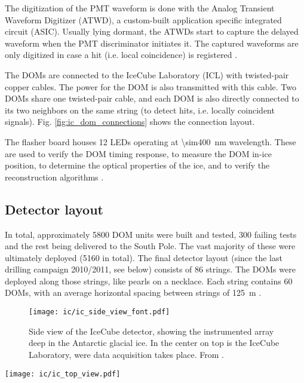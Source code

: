 The digitization of the PMT waveform is done with the Analog Transient Waveform Digitizer (ATWD), a custom-built application specific integrated circuit (ASIC). Usually lying dormant, the ATWDs start to capture the delayed waveform when the PMT discriminator initiates it. The captured waveforms are only digitized in case a hit (i.e. local coincidence) is registered .

The DOMs are connected to the IceCube Laboratory (ICL) with twisted-pair copper cables. The power for the DOM is also transmitted with this cable. Two DOMs share one twisted-pair cable, and each DOM is also directly connected to its two neighbors on the same string (to detect hits, i.e. locally coincident signals). Fig. \ref{fig:ic_dom_connections} shows the connection layout.

The flasher board houses 12 LEDs operating at \SI{\sim400}{\nm} wavelength. These are used to verify the DOM timing response, to measure the DOM in-ice position, to determine the optical properties of the ice, and to verify the reconstruction algorithms \cite{Aartsen2017}.

\subsection{Detector layout}
In total, approximately 5800 DOM units were built and tested, 300 failing tests and the rest being delivered to the South Pole. The vast majority of these were ultimately deployed (5160 in total). The final detector layout (since the last drilling campaign 2010/2011, see below) consists of 86 strings. The DOMs were deployed along those strings, like pearls on a necklace. Each string contains 60 DOMs, with an average horizontal spacing between strings of \SI{125}{\meter} \cite{Aartsen2017}.

\begin{figure}
    \texttt{[image: ic/ic\_side\_view\_font.pdf]}
    \caption[IceCube side-on]{Side view of the IceCube detector, showing the instrumented array deep in the Antarctic glacial ice. In the center on top is the IceCube Laboratory, were data acquisition takes place. From \cite{Ahlers2018a}.}
\end{figure}
\begin{marginfigure}
    \texttt{[image: ic/ic\_top\_view.pdf]}
    \caption[IceCube top-down view]{Top-down view of the IceCube detector, spanning \SI{1}{\square\km} on the surface. From \cite{Ahlers2018a}.}
\end{marginfigure}

